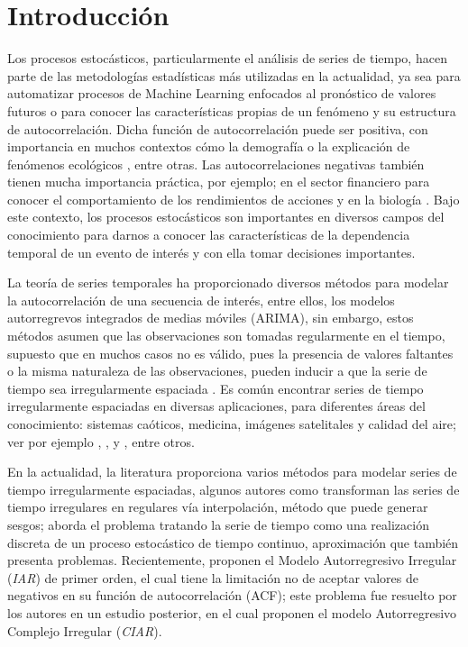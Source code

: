 \chapter{Introducci\'{o}n}
Los procesos estocásticos, particularmente el análisis de series de 
tiempo, hacen parte de las metodologías estadísticas más utilizadas
en la actualidad, ya sea para automatizar procesos de Machine Learning
enfocados al pronóstico de valores futuros o para conocer las
características propias de un fenómeno y su estructura de 
autocorrelación. Dicha función de autocorrelación puede ser 
positiva, con importancia en muchos contextos cómo la demografía
\citep[p.ej.]{novoseltseva2019spatial} o la explicación de 
fenómenos ecológicos \citep[p.ej.]{yang2019predictability}, 
entre otras. Las autocorrelaciones negativas también tienen 
mucha importancia práctica, por ejemplo; en el sector financiero 
para conocer el comportamiento de los rendimientos de acciones 
\citep[p.ej.]{kuttu2017feedback} y en la biología 
\citep[p.ej.]{rindorf2020periodic}. Bajo este contexto, los 
procesos estocásticos son importantes en diversos campos del 
conocimiento para darnos a conocer las características de la
dependencia temporal de un evento de interés y con ella tomar 
decisiones importantes.


La teoría de series temporales ha proporcionado diversos métodos para 
modelar la autocorrelación de una secuencia de interés, entre ellos, 
los modelos autorregrevos integrados de medias móviles (ARIMA), 
sin embargo, estos métodos asumen que las observaciones son tomadas
regularmente en el tiempo, supuesto que en muchos casos no es válido,
pues la presencia de valores faltantes o la misma naturaleza de las 
observaciones, pueden inducir a que la serie de tiempo sea irregularmente
espaciada \citep{elorrieta2019discrete}. Es común encontrar series de 
tiempo irregularmente espaciadas en diversas aplicaciones, para 
diferentes áreas del conocimiento: sistemas caóticos, medicina, 
imágenes satelitales y calidad del aire; ver por ejemplo 
\cite{shamsan2020intrinsic}, \cite{liu2019comparison},
\cite{ghaderpour2020change} y 
\cite{dilmaghani2007harmonic}, entre otros.



En la actualidad, la literatura proporciona varios métodos para
modelar series de tiempo irregularmente espaciadas, algunos 
autores como \cite{adorf1995interpolation} transforman 
las series de tiempo irregulares en regulares vía interpolación,
método que puede generar sesgos;  \cite{robinson1977estimation} 
aborda el problema tratando la serie de tiempo como una realización
discreta de un proceso estocástico de tiempo continuo, aproximación
que también presenta problemas. Recientemente, 
\cite{eyheramendy2018irregular} proponen el Modelo Autorregresivo 
Irregular  (\emph{IAR}) de primer orden, el cual tiene la limitación no 
de aceptar valores de negativos en su función de autocorrelación (ACF); 
este problema fue resuelto por los autores en un estudio posterior,
en el cual proponen el modelo Autorregresivo Complejo Irregular 
(\emph{CIAR}). \citep{elorrieta2019discrete}
 
